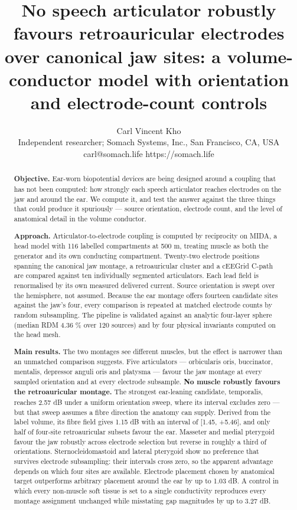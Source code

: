 \documentclass[
  11pt,
  letterpaper,
]{article}
\title{No speech articulator robustly favours retroauricular electrodes over canonical jaw sites: a volume-conductor model with orientation and electrode-count controls}
\author{Carl Vincent Kho \\ Independent researcher; Somach Systems, Inc., San Francisco, CA, USA \\ carl@somach.life \textperiodcentered{} https://somach.life}
\date{}
\begin{document}
\maketitle

\begin{abstract}


\textbf{Objective.} Ear-worn biopotential devices are being designed around a
coupling that has not been computed: how strongly each speech articulator
reaches electrodes on the jaw and around the ear. We compute it, and test the
answer against the three things that could produce it spuriously --- source
orientation, electrode count, and the level of anatomical detail in the volume
conductor.

\textbf{Approach.} Articulator-to-electrode coupling is computed by reciprocity on
MIDA, a head model with 116 labelled compartments at 500 \textmu{}m, treating muscle as
both the generator and its own conducting compartment. Twenty-two electrode
positions spanning the canonical jaw montage, a retroauricular cluster and a
cEEGrid C-path are compared against ten individually segmented articulators.
Each lead field is renormalised by its own measured delivered current. Source
orientation is swept over the hemisphere, not assumed. Because the ear
montage offers fourteen candidate sites against the jaw's four, every comparison
is repeated at matched electrode counts by random subsampling. The pipeline is
validated against an analytic four-layer sphere (median RDM 4.36 \% over 120
sources) and by four physical invariants computed on the head mesh.

\textbf{Main results.} The two montages see different muscles, but the effect is
narrower than an unmatched comparison suggests. Five articulators ---
orbicularis oris, buccinator, mentalis, depressor anguli oris and platysma ---
favour the jaw montage at every sampled orientation and at every electrode
subsample. \textbf{No muscle robustly favours the retroauricular montage.} The
strongest ear-leaning candidate, temporalis, reaches \textminus{}2.57 dB under a uniform
orientation sweep, where its interval excludes zero --- but that sweep assumes a
fibre direction the anatomy can supply. Derived from the label volume, its fibre
field gives \textminus{}1.15 dB with an interval of {[}\textminus{}1.45, +5.46{]}, and only half of
four-site retroauricular subsets favour the ear. Masseter and medial pterygoid
favour the jaw robustly across electrode selection but reverse in roughly a
third of orientations. Sternocleidomastoid and lateral pterygoid show no
preference that survives electrode subsampling: their intervals cross zero, so
the apparent advantage depends on which four sites are available. Electrode
placement chosen by anatomical target outperforms arbitrary placement around
the ear by up to 1.03 dB. A control in which every non-muscle soft tissue is
set to a single conductivity reproduces every montage assignment unchanged
while misstating gap magnitudes by up to 3.27 dB.


\end{abstract}
\end{document}
